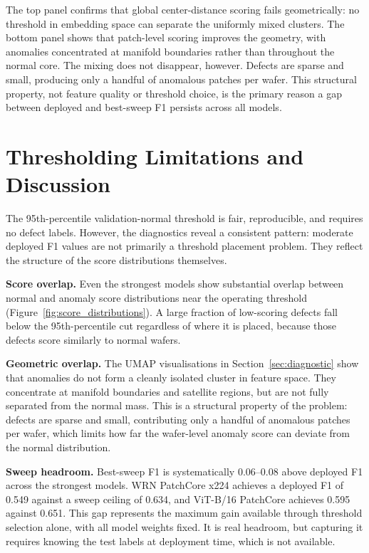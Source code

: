 \documentclass[11pt]{article}
\begin{document}
The top panel confirms that global center-distance scoring fails geometrically: no threshold in embedding space
can separate the uniformly mixed clusters. The bottom panel shows that patch-level scoring improves the geometry,
with anomalies concentrated at manifold boundaries rather than throughout the normal core. The mixing does not
disappear, however. Defects are sparse and small, producing only a handful of anomalous patches per wafer.
This structural property, not feature quality or threshold choice, is the primary reason a gap between
deployed and best-sweep F1 persists across all models.

\section{Thresholding Limitations and Discussion}
\label{sec:thresholding}

The 95th-percentile validation-normal threshold is fair, reproducible, and requires no defect labels. However, the diagnostics reveal a consistent pattern: moderate deployed F1 values are not primarily a threshold placement problem. They reflect the structure of the score distributions themselves.

\textbf{Score overlap.} Even the strongest models show substantial overlap between normal and anomaly score distributions near the operating threshold (Figure~\ref{fig:score_distributions}). A large fraction of low-scoring defects fall below the 95th-percentile cut regardless of where it is placed, because those defects score similarly to normal wafers.

\textbf{Geometric overlap.} The UMAP visualisations in Section~\ref{sec:diagnostic} show that anomalies do not form a cleanly isolated cluster in feature space. They concentrate at manifold boundaries and satellite regions, but are not fully separated from the normal mass. This is a structural property of the problem: defects are sparse and small, contributing only a handful of anomalous patches per wafer, which limits how far the wafer-level anomaly score can deviate from the normal distribution.

\textbf{Sweep headroom.} Best-sweep F1 is systematically $0.06$--$0.08$ above deployed F1 across the strongest models. WRN PatchCore x224 achieves a deployed F1 of 0.549 against a sweep ceiling of 0.634, and ViT-B/16 PatchCore achieves 0.595 against 0.651. This gap represents the maximum gain available through threshold selection alone, with all model weights fixed. It is real headroom, but capturing it requires knowing the test labels at deployment time, which is not available.
\end{document}
